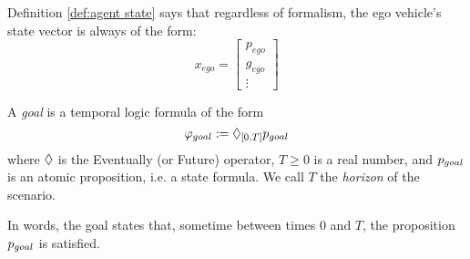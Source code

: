 Definition \ref{def:agent state} says that regardless of formalism, the ego vehicle's state vector is always of the form:
\begin{equation*}
x_{ego} = \left[\begin{matrix}
p_{ego}\\
g_{ego}\\
\vdots
\end{matrix}\right]
\end{equation*}

\begin{defn}
	\label{def:goal}
	A \emph{goal} is a temporal logic formula of the form 
	\[\varphi_{goal} := \Diamond_{[0,T]} p_{goal}\]
	where $\Diamond$ is the Eventually (or Future) operator, $T \geq 0$ is a real number, and 
	$p_{goal}$ is an atomic proposition, i.e. a state formula.
	We call $T$ the \emph{horizon} of the scenario.
\end{defn}
In words, the goal states that, sometime between times 0 and $T$, the proposition $p_{goal}$ is satisfied.

